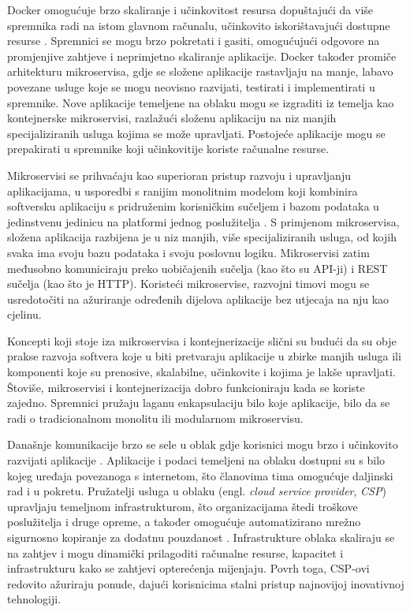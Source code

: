 \documentclass[times, utf8, diplomski]{fer}
\begin{document}
Docker omogućuje brzo skaliranje i učinkovitost resursa dopuštajući da više spremnika radi na istom glavnom računalu, učinkovito iskorištavajući dostupne resurse \cite{docker2020docker}. Spremnici se mogu brzo pokretati i gasiti, omogućujući odgovore na promjenjive zahtjeve i neprimjetno skaliranje aplikacije. Docker također promiče arhitekturu mikroservisa, gdje se složene aplikacije rastavljaju na manje, labavo povezane usluge koje se mogu neovisno razvijati, testirati i implementirati u spremnike. Nove aplikacije temeljene na oblaku mogu se izgraditi iz temelja kao kontejnerske mikroservisi, razlažući složenu aplikaciju na niz manjih specijaliziranih usluga kojima se može upravljati. Postojeće aplikacije mogu se prepakirati u spremnike koji učinkovitije koriste računalne resurse. 

Mikroservisi se prihvaćaju kao superioran pristup razvoju i upravljanju aplikacijama, u usporedbi s ranijim monolitnim modelom koji kombinira softversku aplikaciju s pridruženim korisničkim sučeljem i bazom podataka u jedinstvenu jedinicu na platformi jednog poslužitelja \cite{docker2020docker}. S primjenom mikroservisa, složena aplikacija razbijena je u niz manjih, više specijaliziranih usluga, od kojih svaka ima svoju bazu podataka i svoju poslovnu logiku. Mikroservisi zatim međusobno komuniciraju preko uobičajenih sučelja (kao što su API-ji) i REST sučelja (kao što je HTTP). Koristeći mikroservise, razvojni timovi mogu se usredotočiti na ažuriranje određenih dijelova aplikacije bez utjecaja na nju kao cjelinu.

Koncepti koji stoje iza mikroservisa i kontejnerizacije slični su budući da su obje prakse razvoja softvera koje u biti pretvaraju aplikacije u zbirke manjih usluga ili komponenti koje su prenosive, skalabilne, učinkovite i kojima je lakše upravljati. Štoviše, mikroservisi i kontejnerizacija dobro funkcioniraju kada se koriste zajedno. Spremnici pružaju laganu enkapsulaciju bilo koje aplikacije, bilo da se radi o tradicionalnom monolitu ili modularnom mikroservisu. 

Današnje komunikacije brzo se sele u oblak gdje korisnici mogu brzo i učinkovito razvijati aplikacije \cite{docker2020docker}. Aplikacije i podaci temeljeni na oblaku dostupni su s bilo kojeg uređaja povezanoga s internetom, što članovima tima omogućuje daljinski rad i u pokretu. Pružatelji usluga u oblaku (engl. \emph{cloud service provider}, \emph{CSP}) upravljaju temeljnom infrastrukturom, što organizacijama štedi troškove poslužitelja i druge opreme, a također omogućuje automatizirano mrežno sigurnosno kopiranje za dodatnu pouzdanost \cite{docker2020docker}. Infrastrukture oblaka skaliraju se na zahtjev i mogu dinamički prilagoditi računalne resurse, kapacitet i infrastrukturu kako se zahtjevi opterećenja mijenjaju. Povrh toga, CSP-ovi redovito ažuriraju ponude, dajući korisnicima stalni pristup najnovijoj inovativnoj tehnologiji.
\end{document}
